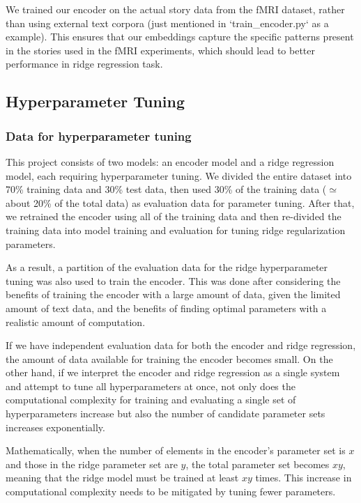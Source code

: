 \documentclass[12pt,letterpaper]{article}
\begin{document}
We trained our encoder on the actual story data from the fMRI dataset, rather than using external text corpora (just mentioned in `train\_encoder.py` as a example). This ensures that our embeddings capture the specific patterns present in the stories used in the fMRI experiments, which should lead to better performance in ridge regression task.

\subsection{Hyperparameter Tuning}

\subsubsection{Data for hyperparameter tuning}

This project consists of two models: an encoder model and a ridge regression model, each requiring hyperparameter tuning. We divided the entire dataset into 70\% training data and 30\% test data, then used 30\% of the training data ($\simeq$ about 20\% of the total data) as evaluation data for parameter tuning. After that, we retrained the encoder using all of the training data and then re-divided the training data into model training and evaluation for tuning ridge regularization parameters.

As a result, a partition of the evaluation data for the ridge hyperparameter tuning was also used to train the encoder. This was done after considering the benefits of training the encoder with a large amount of data, given the limited amount of text data, and the benefits of finding optimal parameters with a realistic amount of computation.

If we have independent evaluation data for both the encoder and ridge regression, the amount of data available for training the encoder becomes small. On the other hand, if we interpret the encoder and ridge regression as a single system and attempt to tune all hyperparameters at once, not only does the computational complexity for training and evaluating a single set of hyperparameters increase but also the number of candidate parameter sets increases exponentially. 

Mathematically, when the number of elements in the encoder's parameter set is $x$ and those in the ridge parameter set are $y$, the total parameter set becomes $xy$, meaning that the ridge model must be trained at least $xy$ times. This increase in computational complexity needs to be mitigated by tuning fewer parameters.
\end{document}
